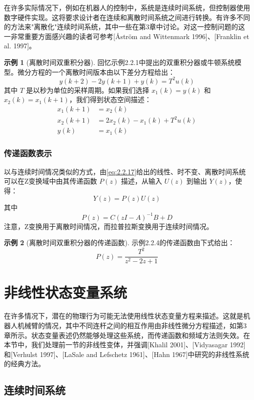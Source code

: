 \documentclass[UTF8,12pt,a4paper]{ctexart}
\theoremstyle{definition}
\newtheorem{example}{示例}[section]
\begin{document}
在许多实际情况下，例如在机器人的控制中，系统是连续时间系统，但控制器使用数字硬件实现。这将要求设计者在连续和离散时间系统之间进行转换。有许多不同的方法来"离散化"连续时间系统，其中一些在第3章中讨论。对这一控制问题的这一非常重要方面感兴趣的读者可参考[Åström and Wittenmark 1996]、[Franklin et al. 1997]。

\begin{example}[离散时间双重积分器]
回忆示例2.2.1中提出的双重积分器或牛顿系统模型。微分方程的一个离散时间版本由以下差分方程给出：
\[
y(k+2) - 2y(k+1) + y(k) = T^2 u(k)
\]
其中 $T$ 是以秒为单位的采样周期。如果我们选择 $x_1(k)=y(k)$ 和 $x_2(k)=x_1(k+1)$，我们得到状态空间描述：
\[
\begin{aligned}
x_1(k+1) &= x_2(k) \\
x_2(k+1) &= 2x_2(k) - x_1(k) + T^2 u(k) \\
y(k) &= x_1(k)
\end{aligned}
\]
\end{example}

\subsubsection{传递函数表示}

以与连续时间情况类似的方式，由\eqref{eq:2.2.17}给出的线性、时不变、离散时间系统可以在Z变换域中由其传递函数 $P(z)$ 描述，从输入 $U(z)$ 到输出 $Y(z)$，使得：
\[
Y(z) = P(z)U(z)
\]
其中
\[
P(z) = C(zI-A)^{-1}B + D
\]
注意，Z变换用于离散时间情况，而拉普拉斯变换用于连续时间情况。

\begin{example}[离散时间双重积分器的传递函数]
示例2.2.4的传递函数由下式给出：
\[
P(z) = \frac{T^2}{z^2 - 2z + 1}
\]
\end{example}

\section{非线性状态变量系统}

在许多情况下，潜在的物理行为可能无法使用线性状态变量方程来描述。这就是机器人机械臂的情况，其中不同连杆之间的相互作用由非线性微分方程描述，如第3章所示。状态变量表述仍然能够处理这些系统，而传递函数和频域方法则失效。在本节中，我们处理前一节的非线性变体，并强调[Khalil 2001]、[Vidyasagar 1992]和[Verhulst 1997]、[LaSale and Lefschetz 1961]、[Hahn 1967]中研究的非线性系统的经典方法。

\subsection{连续时间系统}
\end{document}
